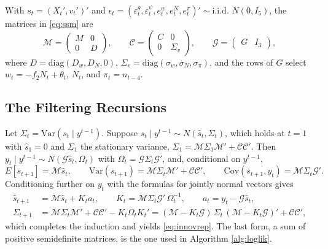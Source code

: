 \documentclass[12pt]{article}
\begin{document}
With $s_t = (X_t', v_t')'$ and $\epsilon_t = (\varepsilon^{\theta}_t, \varepsilon^{\psi}_t, e^{w}_t, e^{N}_t, e^{\pi}_t)' \sim \text{i.i.d. } N(0, I_5)$, the matrices in \eqref{eq:ssm} are
\[
  \mathcal{M} = \begin{pmatrix} M & 0 \\ 0 & D \end{pmatrix}, \qquad
  \mathcal{C} = \begin{pmatrix} C & 0 \\ 0 & \Sigma_v \end{pmatrix}, \qquad
  \mathcal{G} = \begin{pmatrix} G & I_3 \end{pmatrix},
\]
where $D = \mathrm{diag}(D_w, D_N, 0)$, $\Sigma_v = \mathrm{diag}(\sigma_w, \sigma_N, \sigma_\pi)$, and the rows of $G$ select $w_t = -f_2 N_t + \theta_t$, $N_t$, and $\pi_t = n_{t-4}$.

\subsection{The Filtering Recursions}\label{app:recursion}

Let $\Sigma_t = \mathrm{Var}(s_t \mid y^{t-1})$. Suppose $s_t \mid y^{t-1} \sim N(\hat{s}_t, \Sigma_t)$, which holds at $t=1$ with $\hat{s}_1 = 0$ and $\Sigma_1$ the stationary variance, $\Sigma_1 = \mathcal{M}\Sigma_1\mathcal{M}' + \mathcal{C}\mathcal{C}'$. Then $y_t \mid y^{t-1} \sim N(\mathcal{G}\hat{s}_t, \Omega_t)$ with $\Omega_t = \mathcal{G}\Sigma_t\mathcal{G}'$, and, conditional on $y^{t-1}$,
\[
  E[s_{t+1}] = \mathcal{M}\hat{s}_t, \qquad
  \mathrm{Var}(s_{t+1}) = \mathcal{M}\Sigma_t\mathcal{M}' + \mathcal{C}\mathcal{C}', \qquad
  \mathrm{Cov}(s_{t+1}, y_t) = \mathcal{M}\Sigma_t\mathcal{G}' .
\]
Conditioning further on $y_t$ with the formulas for jointly normal vectors gives
\begin{align*}
  \hat{s}_{t+1} &= \mathcal{M}\hat{s}_t + K_t a_t, \qquad K_t = \mathcal{M}\Sigma_t\mathcal{G}'\,\Omega_t^{-1}, \qquad a_t = y_t - \mathcal{G}\hat{s}_t, \\
  \Sigma_{t+1} &= \mathcal{M}\Sigma_t\mathcal{M}' + \mathcal{C}\mathcal{C}' - K_t\Omega_t K_t'
               = (\mathcal{M} - K_t\mathcal{G})\,\Sigma_t\,(\mathcal{M} - K_t\mathcal{G})' + \mathcal{C}\mathcal{C}' ,
\end{align*}
which completes the induction and yields \eqref{eq:innovrep}. The last form, a sum of positive semidefinite matrices, is the one used in Algorithm \ref{alg:loglik}.
\end{document}
